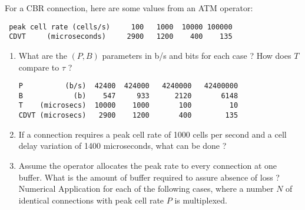 \begin{problem}
For a CBR connection, here are some values from an ATM operator:
        \begin{verbatim}
 peak cell rate (cells/s)     100   1000  10000 100000
 CDVT     (microseconds)     2900   1200    400    135
        \end{verbatim}
        \begin{enumerate}
                \item What are the $(P, B)$ parameters in b/s and bits for
                each case ?  How does $T$ compare to $\tau$ ?
\ifsol

\begin{verbatim}
P          (b/s)  42400  424000   4240000   42400000
B            (b)    547     933      2120       6148
T    (microsecs)  10000    1000       100         10
CDVT (microsecs)   2900    1200       400        135
\end{verbatim}
\fi
                \item If a connection requires a peak cell rate of 1000 cells
                per second and a cell delay variation of 1400 microseconds,
                what can be done ?
                \item Assume the operator allocates the peak rate to every
                connection at one buffer.  What is the amount of buffer
                required to assure absence of loss ?  Numerical Application
                for each of the following cases, where a number $N$ of
                identical connections with peak cell rate $P$ is multiplexed.

\end{enumerate}
\end{problem}
